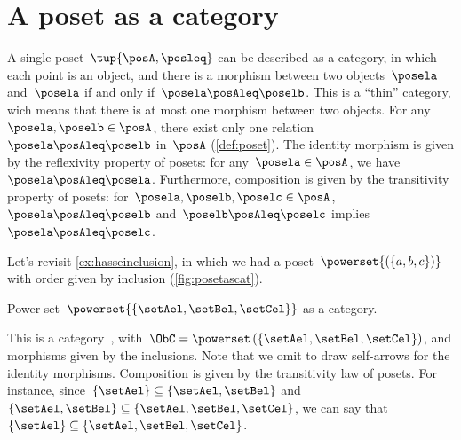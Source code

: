 

\section{A poset as a category}
\label{sec:posetsarecats}
A single poset~$\tup{\posA, \posleq}$ can be described as a category, in which each point is an object, and there is a morphism between two objects~$\posela$ and~$\posela$ if and only if~$\posela \posAleq \poselb$.
This is a ``thin'' category, wich means that there is at most one morphism between two objects.
For any~$\posela,\poselb\in \posA$, there exist only one relation~$\posela\posAleq \poselb$ in~$\posA$ (\cref{def:poset}).
The identity morphism is given by the reflexivity property of posets: for any~$\posela\in \posA$, we have~$\posela \posAleq \posela$.
Furthermore, composition is given by the transitivity property of posets: for~$\posela,\poselb,\poselc \in \posA$,~$\posela\posAleq \poselb$ and~$\poselb\posAleq \poselc$ implies~$\posela\posAleq \poselc$.

\begin{example}
  Let's revisit \cref{ex:hasseinclusion}, in which we had a poset~$\powerset{\left(\{a,b,c\}\right)}$ with order given by inclusion (\cref{fig:posetascat}).

  \begin{marginfigure}
    \begin{center}
    \end{center}
    \caption{Power set~$\powerset{\{\setAel,\setBel,\setCel\}}$ as a category. \label{fig:posetascat}}
  \end{marginfigure}

  This is a category~\CatC, with~$\ObC=\powerset\left(\{\setAel,\setBel,\setCel\}\right)$, and morphisms given by the inclusions.
  Note that we omit to draw self-arrows for the identity morphisms.
  Composition is given by the transitivity law of posets. For instance, since~$\{\setAel\}\subseteq \{\setAel,\setBel\}$ and~$\{\setAel,\setBel\} \subseteq \{\setAel,\setBel,\setCel\}$, we can say that~$\{\setAel\}\subseteq \{\setAel,\setBel,\setCel\}$.
\end{example}


